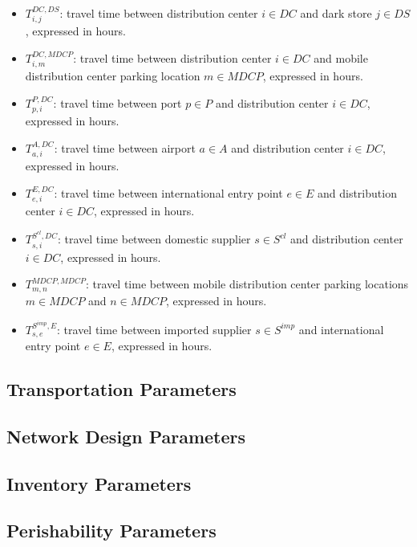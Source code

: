 \documentclass[12pt]{article}
\begin{document}
\begin{itemize}
    \item $T^{DC,DS}_{i,j}$: travel time between distribution center $i \in DC$ and dark store $j \in DS$, expressed in hours.

    \item $T^{DC,MDCP}_{i,m}$: travel time between distribution center $i \in DC$ and mobile distribution center parking location $m \in MDCP$, expressed in hours.

    \item $T^{P,DC}_{p,i}$: travel time between port $p \in P$ and distribution center $i \in DC$, expressed in hours.

    \item $T^{A,DC}_{a,i}$: travel time between airport $a \in A$ and distribution center $i \in DC$, expressed in hours.
    
    \item $T^{E,DC}_{e,i}$: travel time between international entry point $e \in E$ and distribution center $i \in DC$, expressed in hours.
    
    \item $T^{S^{cl},DC}_{s,i}$: travel time between domestic supplier $s \in S^{cl}$ and distribution center $i \in DC$, expressed in hours.

    \item $T^{MDCP,MDCP}_{m,n}$: travel time between mobile distribution center parking locations $m \in MDCP$ and $n \in MDCP$, expressed in hours.
    
    \item $T^{S^{imp},E}_{s,e}$: travel time between imported supplier $s \in S^{imp}$ and international entry point $e \in E$, expressed in hours.
\end{itemize}

\subsection{Transportation Parameters}

\subsection{Network Design Parameters}

\subsection{Inventory Parameters}

\subsection{Perishability Parameters}
\end{document}
